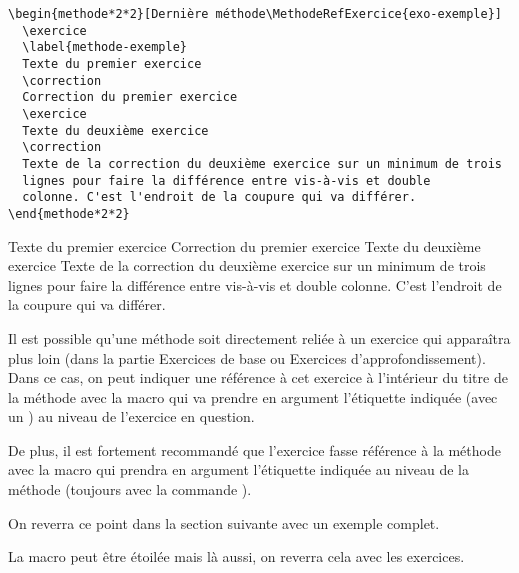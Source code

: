 \documentclass[nocrop]{sesamanuel}
\begin{document}
\begin{code}\label{code-methode-exemple}
\begin{verbatim}
\begin{methode*2*2}[Dernière méthode\MethodeRefExercice{exo-exemple}]
  \exercice
  \label{methode-exemple}
  Texte du premier exercice
  \correction
  Correction du premier exercice
  \exercice
  Texte du deuxième exercice
  \correction
  Texte de la correction du deuxième exercice sur un minimum de trois
  lignes pour faire la différence entre vis-à-vis et double
  colonne. C'est l'endroit de la coupure qui va différer.
\end{methode*2*2}
\end{verbatim}
\end{code}
\begin{result}
 
\end{result}

\begin{methode*2*2}
  \exercice
  \label{methode-exemple}
  Texte du premier exercice
  \correction
  Correction du premier exercice
  \exercice
  Texte du deuxième exercice
  \correction
  Texte de la correction du deuxième exercice sur un minimum de trois
  lignes pour faire la différence entre vis-à-vis et double
  colonne. C'est l'endroit de la coupure qui va différer.
\end{methode*2*2}
\label{exemple-methode-fin}

\begin{remarque}
Il est possible qu'une méthode soit directement reliée à un exercice
qui apparaîtra plus loin (dans la partie Exercices de base ou
Exercices d'approfondissement). \\Dans ce cas, on peut indiquer une
référence à cet exercice à l'intérieur du titre de la méthode avec
la macro  qui va prendre en argument
l'étiquette indiquée (avec un ) au niveau de l'exercice en
question. 

De plus, il est fortement recommandé que l'exercice fasse
référence à la méthode avec la macro  qui
prendra en argument l'étiquette indiquée au niveau de la méthode
(toujours avec la commande ). 

On reverra ce point dans la
section suivante avec un exemple complet. 

La macro
 peut être étoilée mais là aussi, on reverra
cela avec les exercices.
\end{remarque}
\clearpage
\end{document}
